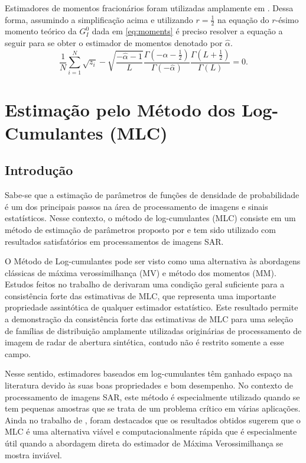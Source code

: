 Estimadores de momentos fracionários foram utilizadas amplamente em \citet{Clutter1997}. Dessa forma, assumindo a simplificação acima e utilizando $r=\frac{1}{2}$ na equação do $r$-ésimo momento teórico da $G_I^0$ dada em \eqref{eq:moments} é preciso resolver a equação a seguir para se obter o estimador de momentos denotado por $\widehat{\alpha}$.
\begin{equation}
    \frac{1}{N}\sum_{i=1}^{N}\sqrt{z_i}-\sqrt{\frac{-\widehat{\alpha} - 1}{L}}\frac{\Gamma(-\widehat{\alpha} - \frac{1}{2})}{\Gamma(-\widehat{\alpha})}\frac{\Gamma(L+\frac{1}{2})}{\Gamma(L)} = 0 .\label{fractional_moments}
\end{equation} 

\section{Estimação pelo Método dos Log-Cumulantes (MLC)}

\subsection{Introdução}

Sabe-se que a estimação de parâmetros de funções de densidade de probabilidade é um dos principais passos na área de processamento de imagens e sinais estatísticos. Nesse contexto, o método de log-cumulantes (MLC) consiste em um método de estimação de parâmetros proposto por \citet{nicolas2002} e tem sido utilizado com resultados satisfatórios em processamentos de imagens SAR.

O Método de Log-cumulantes pode ser visto como uma alternativa às abordagens clássicas de máxima verossimilhança (MV) e método dos momentos (MM). 
Estudos feitos no trabalho de \citet{krylov2013} derivaram uma condição geral suficiente para a consistência forte das estimativas de MLC, que representa uma importante propriedade assintótica de qualquer estimador estatístico. 
Este resultado permite a demonstração da consistência forte das estimativas de MLC para uma seleção de famílias de distribuição amplamente utilizadas originárias de processamento de imagem de radar de abertura sintética, contudo não é restrito somente a esse campo. 

Nesse sentido, estimadores baseados em log-cumulantes têm ganhado espaço na literatura devido às suas boas propriedades e bom desempenho. 
No contexto de processamento de imagens SAR, este método é especialmente utilizado quando se tem pequenas amostras que se trata de um problema crítico em várias aplicações. 
Ainda no trabalho de \citet{krylov2013}, foram destacados que os resultados obtidos sugerem que o MLC é uma alternativa viável e computacionalmente rápida que é especialmente útil quando a abordagem direta do estimador de Máxima Verossimilhança se mostra inviável. 

